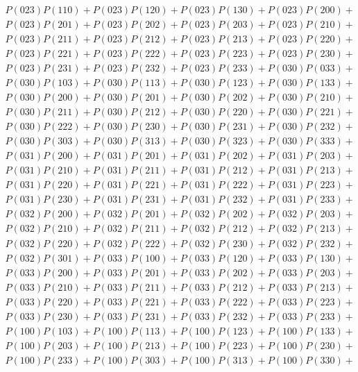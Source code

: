 \documentclass{article}
\theoremstyle{definition}
\begin{document}
\begin{gather*}
    P(023)P(110) + P(023)P(120) + P(023)P(130) + P(023)P(200) + \\
    P(023)P(201) + P(023)P(202) + P(023)P(203) + P(023)P(210) + \\
    P(023)P(211) + P(023)P(212) + P(023)P(213) + P(023)P(220) + \\
    P(023)P(221) + P(023)P(222) + P(023)P(223) + P(023)P(230) + \\
    P(023)P(231) + P(023)P(232) + P(023)P(233) + P(030)P(033) + \\
    P(030)P(103) + P(030)P(113) + P(030)P(123) + P(030)P(133) + \\
    P(030)P(200) + P(030)P(201) + P(030)P(202) + P(030)P(210) + \\
    P(030)P(211) + P(030)P(212) + P(030)P(220) + P(030)P(221) + \\
    P(030)P(222) + P(030)P(230) + P(030)P(231) + P(030)P(232) + \\
    P(030)P(303) + P(030)P(313) + P(030)P(323) + P(030)P(333) + \\
    P(031)P(200) + P(031)P(201) + P(031)P(202) + P(031)P(203) + \\
    P(031)P(210) + P(031)P(211) + P(031)P(212) + P(031)P(213) + \\
    P(031)P(220) + P(031)P(221) + P(031)P(222) + P(031)P(223) + \\
    P(031)P(230) + P(031)P(231) + P(031)P(232) + P(031)P(233) + \\
    P(032)P(200) + P(032)P(201) + P(032)P(202) + P(032)P(203) + \\
    P(032)P(210) + P(032)P(211) + P(032)P(212) + P(032)P(213) + \\
    P(032)P(220) + P(032)P(222) + P(032)P(230) + P(032)P(232) + \\
    P(032)P(301) + P(033)P(100) + P(033)P(120) + P(033)P(130) + \\
    P(033)P(200) + P(033)P(201) + P(033)P(202) + P(033)P(203) + \\
    P(033)P(210) + P(033)P(211) + P(033)P(212) + P(033)P(213) + \\
    P(033)P(220) + P(033)P(221) + P(033)P(222) + P(033)P(223) + \\
    P(033)P(230) + P(033)P(231) + P(033)P(232) + P(033)P(233) + \\
    P(100)P(103) + P(100)P(113) + P(100)P(123) + P(100)P(133) + \\
    P(100)P(203) + P(100)P(213) + P(100)P(223) + P(100)P(230) + \\
    P(100)P(233) + P(100)P(303) + P(100)P(313) + P(100)P(330) + \\

\end{gather*}
\end{document}
